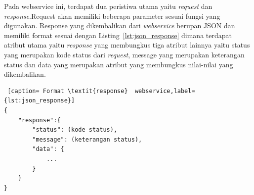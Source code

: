\hspace{0,5cm}Pada webservice ini, terdapat dua peristiwa utama yaitu \textit{request} dan \textit{response}.Request akan memiliki beberapa parameter sesuai fungsi yang digunakan. Response yang dikembalikan dari \textit{webservice} berupan JSON dan memiliki format sesuai dengan Listing~\ref{lst:json_response} dimana terdapat atribut utama yaitu \textit{response} yang membungkus tiga atribut lainnya yaitu status yang merupakan kode status dari \textit{request}, message yang merupakan keterangan status dan data yang merupakan atribut yang membungkus nilai-nilai yang dikembalikan.

\begin{lstlisting} [caption= Format \textit{response}  webservice,label={lst:json_response}]
{
	"response":{
		"status": (kode status),
		"message": (keterangan status),
		"data": {
			...
		}
	}
}
\end{lstlisting}


